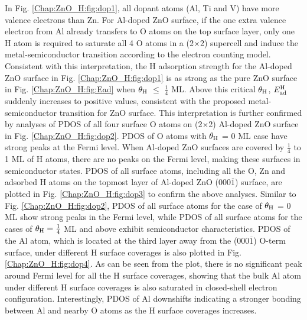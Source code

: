 In Fig. \ref{Chap:ZnO_H:fig:dop1}, all dopant atoms (Al, Ti and V) have more valence electrons than Zn. For Al-doped ZnO surface, if the one extra valence electron from Al already transfers to O atoms on the top surface layer, only one H atom is required to saturate all 4 O atoms in a (2$\times$2) supercell and induce the metal-semiconductor transition according to the electron counting model. Consistent with this interpretation, the H adsorption strength for the Al-doped ZnO surface in Fig. \ref{Chap:ZnO_H:fig:dop1} is as strong as the pure ZnO surface in Fig. \ref{Chap:ZnO_H:fig:Ead} when $\theta_{\textup{H}}$ $\leq$ $\frac{1}{4}$ ML. Above this critical $\theta_{\textup{H}}$, $E_{\textup{ad}}^{\textup{H}}$ suddenly increases to positive values, consistent with the proposed metal-semiconductor transition for ZnO surface. This interpretation is further confirmed by analyses of \ac{PDOS} of all four surface O atoms on (2$\times$2) Al-doped ZnO surface in Fig. \ref{Chap:ZnO_H:fig:dop2}. \ac{PDOS} of O atoms with $\theta_{\textup{H}}$ = 0 ML case have strong peaks at the Fermi level. When Al-doped ZnO surfaces are covered by $\frac{1}{4}$ to 1 ML of H atoms, there are no peaks on the Fermi level, making these surfaces in semiconductor states. \ac{PDOS} of all surface atoms, including all the O, Zn and adsorbed H atoms on the topmost layer of Al-doped ZnO (000$\overline{1}$) surface, are plotted in Fig. \ref{Chap:ZnO_H:fig:dop3} to confirm the above analyses. Similar to Fig. \ref{Chap:ZnO_H:fig:dop2},  \ac{PDOS} of all surface atoms for the case of $\theta_{\textup{H}}$ =  0 ML  show strong peaks in the Fermi level, while \ac{PDOS} of all surface atoms for the cases of $\theta_{\textup{H}}=\frac{1}{4}$ ML and above exhibit semiconductor characteristics. \ac{PDOS} of the Al atom, which is located at the third layer away from the (000$\overline{1}$) O-term surface, under different H surface coverages is also plotted in Fig. \ref{Chap:ZnO_H:fig:dop4}.  As can be seen from the plot, there is no significant peak around Fermi level for all the H surface coverages, showing that the bulk Al atom under different H surface coverages is also saturated in closed-shell electron configuration. Interestingly, \ac{PDOS} of Al downshifts indicating a stronger bonding between Al and nearby O atoms as the H surface coverages increases.

